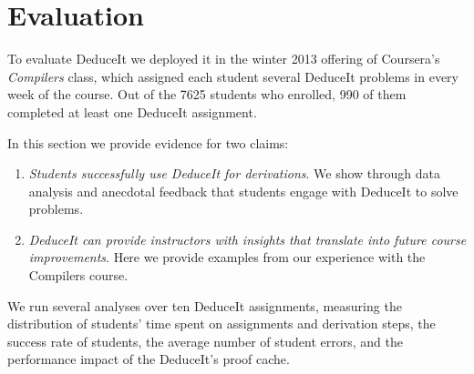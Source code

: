 \documentclass{sigchi}
\begin{document}
\section{Evaluation}

To evaluate DeduceIt we deployed it in the winter 2013 offering of Coursera's \textit{Compilers} class, which assigned each student several DeduceIt problems in every week of the course. Out of the 7625 students who enrolled, 990 of them completed at least one DeduceIt assignment. %

In this section we provide evidence for two claims:

\begin{enumerate}
  \item \textit{Students successfully use DeduceIt for derivations}. We show through data analysis and anecdotal feedback that students engage with DeduceIt to solve problems.
  \item \textit{DeduceIt can provide instructors with insights that translate into future course improvements}. Here we provide examples from our experience with the Compilers course. 
\end{enumerate}
  
We run several analyses over ten DeduceIt assignments, measuring the distribution of students' time spent on assignments and derivation steps, the success rate of students, the average number of student errors, and the performance impact of the DeduceIt's proof cache.
\end{document}
